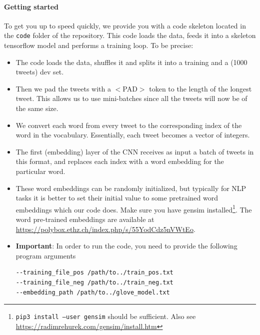 \documentclass{article}
\begin{document}
\paragraph{Getting started} To get you up to speed quickly, we provide you with a code skeleton located in the \texttt{code} folder of the repository. This code loads the data, feeds it into a skeleton tensorflow model and performs a training loop.  To be precise:
\begin{itemize}
\item The code loads the data, shuffles it and splits it into a training and a (1000 tweets) dev set.
\item Then we pad the tweets with a $<$PAD$>$ token to the length of the longest tweet. This allows us to use mini-batches since all the tweets will now be of the same size.
\item We convert each word from every tweet to the corresponding index of the word in the vocabulary. Essentially, each tweet becomes a vector of integers.
\item 
The first (embedding) layer of the CNN receives as input a batch of tweets in this format, and replaces each index with a word embedding for the particular word.
\item These word embeddings can be randomly initialized, but typically for NLP tasks it is better to set their initial value to some pretrained word embeddings which our code does. Make sure you have gensim installed\footnote{\texttt{pip3 install --user gensim} should be sufficient. Also see \url{https://radimrehurek.com/gensim/install.htm}}. The word pre-trained embeddings are available at \url{https://polybox.ethz.ch/index.php/s/55YodCdz5nVWtEo}.
\item \textbf{Important}: In order to run the code, you need to provide the following program arguments 	
\begin{verbatim}
--training_file_pos /path/to../train_pos.txt
--training_file_neg /path/to../train_neg.txt
--embedding_path /path/to../glove_model.txt
\end{verbatim}
\end{itemize}
\end{document}
